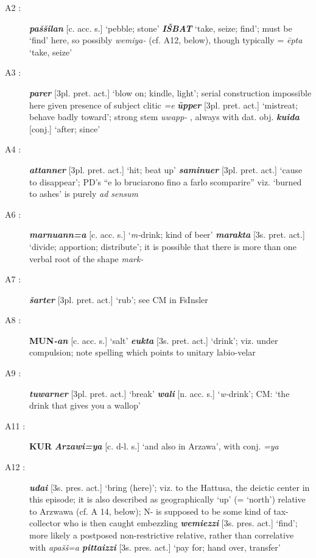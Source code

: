 \documentclass[10pt]{article}
\newcommand{\bit}[1]{\textbf{\textit{#1}}}				%
\newcommand{\p}[1]{{\tiny[{#1}]}}					%
\newcommand{\hith}{\textsubwedge{h}}
\renewcommand{\.}[1]{\textsubdot{#1}}
\begin{document}
\begin{description}
\item[A2 :] \bit{pa\v{s}\v{s}ilan} \p{c. acc. s.} `pebble; stone' \bit{I\v{S}BAT} `take, seize; find'; must be `find' here, so possibly \textit{wemiya-} (cf. A12, below), though typically = \textit{\=epta} `take, seize'

\item[A3 :] \bit{parer} \p{3pl. pret. act.} `blow on; kindle, light'; serial construction impossible here given presence of subject clitic \textit{=e} \bit{{\hith}\=upper} \p{3pl. pret. act.} `mistreat; behave badly toward'; strong stem \textit{{\hith}uwapp-} , always with dat. obj. \bit{kuida} \p{conj.} `after; since'

\item[A4 :] \bit{{\hith}attanner} \p{3pl. pret. act.} `hit; beat up'
\bit{saminuer} \p{3pl. pret. act.} `cause to disappear'; PD's ``e lo bruciarono fino a farlo scomparire'' viz. `burned to ashes' is purely \textit{ad sensum}

\item[A6 :] \bit{marnuann=a} \p{c. acc. s.} `\textit{m-}drink; kind of beer' \bit{marakta} \p{3s. pret. act.} `divide; apportion; distribute'; it is possible that there is more than one verbal root of the shape \textit{mark-} 

\item[A7 :] \bit{\v{s}arter} \p{3pl. pret. act.} `rub'; see CM in FsInsler

\item[A8 :] \textbf{MUN}\bit{-an} \p{c. acc. s.} `salt' \bit{eukta} \p{3s. pret. act.} `drink'; viz. under compulsion; note spelling which points to unitary labio-velar

\item[A9 :] \bit{tuwarner} \p{3pl. pret. act.} `break' \bit{wal{\hith}i} \p{n. acc. s.} `\textit{w-}drink'; CM: `the drink that gives you a wallop'

\item[A11 :] \textbf{KUR}\bit{ Arzawi=ya} \p{c. d-l. s.} `and also in Arzawa', with conj. \textit{=ya}

\item[A12 :] \bit{udai} \p{3s. pres. act.} `bring (here)'; viz. to the Hattusa, the deictic center in this episode; it is also described as geographically `up' (= `north') relative to Arzwawa (cf. A 14, below); N- is supposed to be some kind of tax-collector who is then caught embezzling \bit{wemiezzi} \p{3s. pres. act.} `find'; more likely a postposed non-restrictive relative, rather than correlative with \textit{apa\v{s}\v{s}=a} \bit{pittaizzi} \p{3s. pres. act.} `pay for; hand over, transfer'


\end{description}
\end{document}
